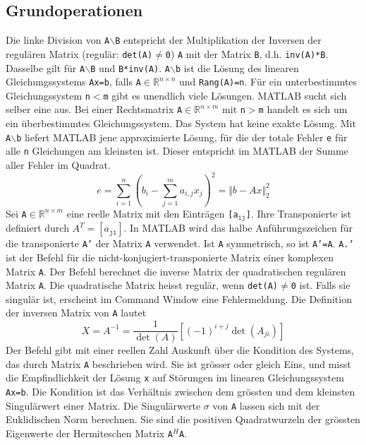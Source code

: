 \subsection{Grundoperationen}
Die linke Division \boxed{\textbf{\texttt{$\backslash$}}} von \texttt{A$\backslash$B} entspricht der Multiplikation der Inversen der regulären Matrix (regulär: \texttt{det(A)$\neq$0}) \texttt{A} mit der Matrix \texttt{B}, d.h. \texttt{inv(A)*B}. Dasselbe gilt für \texttt{A$\backslash$B} und \texttt{B*inv(A)}. \texttt{A$\backslash$b} ist die Lösung des linearen Gleichungssystems \texttt{Ax=b}, falls \texttt{A$\in\mathbb{R}^{n\times n}$} und \texttt{Rang(A)=n}. Für ein unterbestimmtes Gleichungssystem \texttt{n$<$m} gibt es unendlich viele Lösungen. MATLAB sucht sich selber eine aus. Bei einer Rechtsmatrix \texttt{A$\in\mathbb{R}^{n\times m}$} mit \texttt{n$>$m} handelt es sich um ein überbestimmtes Gleichungssystem. Das System hat keine exakte Lösung. Mit \texttt{A$\backslash$b} liefert MATLAB jene approximierte Lösung, für die der totale Fehler \texttt{e} für alle \texttt{n} Gleichungen am kleinsten ist. Dieser entspricht im MATLAB der Summe aller Fehler im Quadrat.
\begin{equation}
\boxed{e=\displaystyle \sum_{i=1}^n\left(b_i-\displaystyle \sum_{j=1}^m a_{i,j} x_j \right)^2=\Big\Vert b-Ax\Big\Vert_2^2}
\end{equation}
Sei \texttt{A$\in\mathbb{R}^{n\times m}$} eine reelle Matrix mit den Einträgen \texttt{[a$_{\texttt{ij}}$]}. Ihre Transponierte ist definiert durch \texttt{$A^T=[a_{\texttt{ji}}]$}. In MATLAB wird das halbe  Anführungszeichen für die transponierte \texttt{A'} der Matrix \texttt{A} verwendet. Ist \texttt{A} symmetrisch, so ist \texttt{A'=A}. \texttt{A.'} ist der Befehl für die nicht-konjugiert-transponierte Matrix einer komplexen Matrix \texttt{A}.
\newline\newline
Der Befehl  berechnet die inverse Matrix der quadratischen regulären Matrix \texttt{A}. Die quadratische Matrix heisst regulär, wenn \texttt{det(A)$\neq$0} ist. Falls sie singulär ist, erscheint im Command Window eine Fehlermeldung. Die Definition der inversen Matrix von \texttt{A} lautet
\begin{equation}
\boxed{X=A^{-1}=\dfrac{1}{\det(A)}[(-1)^{i+j}\det(A_{ji})]}
\end{equation}
Der Befehl  gibt mit einer reellen Zahl Auskunft über die Kondition des Systems, das durch Matrix \texttt{A} beschrieben wird. Sie ist grösser oder gleich Eins, und misst die Empfindlichkeit der Lösung \texttt{x} auf Störungen im linearen Gleichungssystem \texttt{Ax=b}. Die Kondition ist das Verhältnis zwischen dem grössten und dem kleinsten Singulärwert einer Matrix. Die Singulärwerte \texttt{$\sigma$} von \texttt{A} lassen sich mit der Euklidischen Norm berechnen. Sie sind die positiven Quadratwurzeln der grössten Eigenwerte der Hermiteschen Matrix \texttt{A$^H$A}. 

